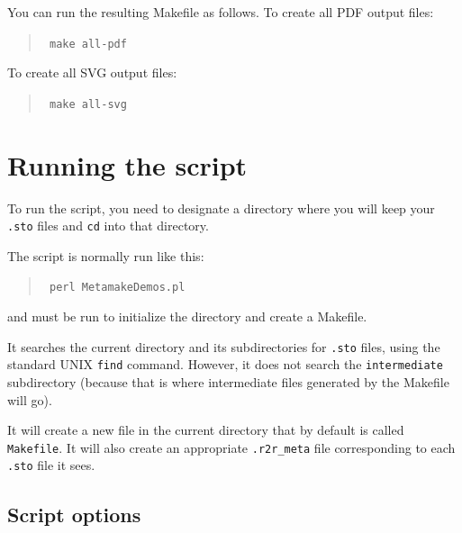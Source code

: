 \documentclass[letterpaper,12pt]{report}
\newcommand{\example}[1]{
\begin{quote}
{\raggedright
#1
}
\end{quote}
}
\newcommand{\examplett}[1]{
\example{{\tt #1}}
}
\begin{document}
You can run the resulting Makefile as follows.  To create all PDF output files:
\examplett{
make all-pdf
}
To create all SVG output files:
\examplett{
make all-svg
}

\section{Running the script}

To run the script, you need to designate a directory where you will keep your {\tt .sto} files and {\tt cd} into that directory.

The script is normally run like this:
\examplett{
perl MetamakeDemos.pl
}
and must be run to initialize the directory and create a Makefile.

It searches the current directory and its subdirectories for {\tt .sto} files, using the standard
UNIX {\tt find} command.
However, it does not search the {\tt intermediate} subdirectory (because that is where intermediate files generated by the Makefile will go).

It will create a new file in the current directory that by default is called  {\tt Makefile}.
It will also create an appropriate {\tt .r2r\_meta} file corresponding to each {\tt .sto} file it sees.

\subsection{Script options}
\end{document}
